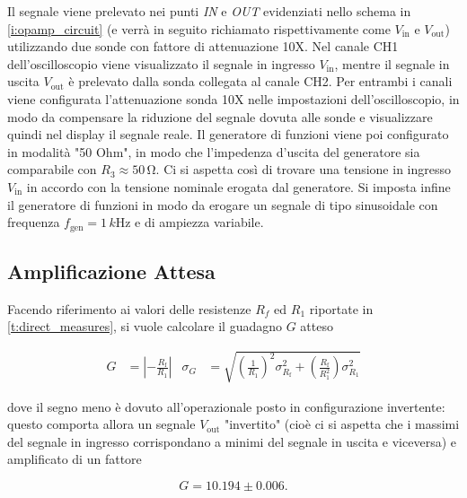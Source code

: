 \documentclass[a4paper,11pt]{article} %
\begin{document}
\noindent Il segnale viene prelevato nei punti \textit{IN} e \textit{OUT} evidenziati nello schema in
\autoref{i:opamp_circuit} (e verrà in seguito richiamato rispettivamente come $V_{\text{in}}$ e $V_{\text{out}}$)
utilizzando due sonde con fattore di attenuazione 10X. Nel canale CH1 dell'oscilloscopio viene visualizzato il segnale
in ingresso $V_{\text{in}}$, mentre il segnale in uscita $V_{\text{out}}$ è prelevato dalla sonda collegata al canale
CH2. Per entrambi i canali viene configurata l'attenuazione sonda 10X nelle impostazioni dell'oscilloscopio, in modo da
compensare la riduzione del segnale dovuta alle sonde e visualizzare quindi nel display il segnale reale. Il generatore
di funzioni viene poi configurato in modalità "50 Ohm", in modo che l'impedenza d'uscita del generatore sia comparabile
con $R_3\approx 50\,\si{\ohm}$. Ci si aspetta così di trovare una tensione in ingresso $V_{\text{in}}$ in accordo con la
tensione nominale erogata dal generatore. Si imposta infine il generatore di funzioni in modo da erogare un segnale di
tipo sinusoidale con frequenza $f_{\text{gen}}=1\,\si{k\hertz}$ e di ampiezza variabile.


\subsection{Amplificazione Attesa}\label{s:guadagno}
Facendo riferimento ai valori delle resistenze  $R_f$ ed $R_1$ riportate in  \autoref{t:direct_measures}, si vuole
calcolare il guadagno $G$ atteso

\begin{align}\label{e:guadagno}
	G&=\left|-\frac{R_{\text{f}}}{R_{1}}\right| 
	&
	\sigma_{G}&=\sqrt{	\left(	\frac{	1	}{	R_{1}	}	\right)^2	\sigma_{R_{\text{f}}}^2	
	+	\left(	\frac{	R_{\text{f}}	}{	R_{1}^2	}	\right)\sigma_{R_{1}}^2	}	
\end{align}

\noindent dove il segno meno è dovuto all'operazionale posto in configurazione invertente: questo comporta allora un
segnale  $V_{\text{out}}$ "invertito" (cioè ci si aspetta che i massimi del segnale in ingresso corrispondano a minimi
del segnale in uscita e viceversa) e amplificato di un fattore 

\begin{equation}
	G = 10.194 \pm 0.006.
\end{equation}
\end{document}
